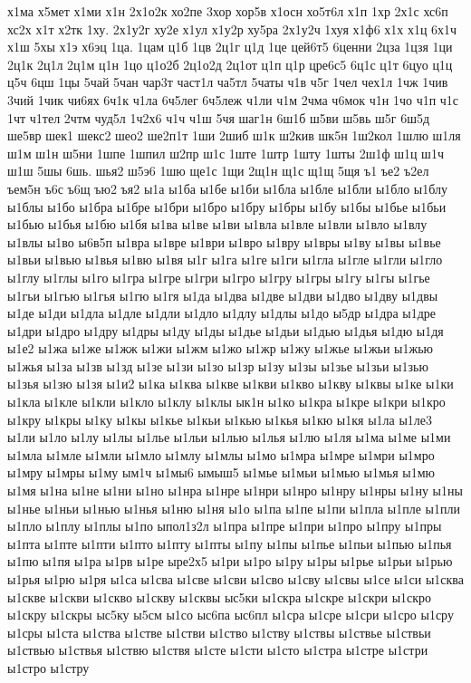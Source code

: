 {х1ма
х5мет
х1ми
х1н
2х1о2к
хо2пе
3хор
хор5в
х1осн
хо5т6л
х1п
1хр
2х1с
хс6п
хс2х
х1т
х2тк
1ху.
2х1у2г
ху2е
х1ул
х1у2р
ху5ра
2х1у2ч
1хуя
х1ф6
х1х
х1ц
6х1ч
х1ш
5хы
х1э
х6эц
1ца.
1цам
ц1б
1цв
2ц1г
ц1д
1це
цей6т5
6ценни
2цза
1цзя
1ци
2ц1к
2ц1л
2ц1м
ц1н
1цо
ц1о2б
2ц1о2д
2ц1от
ц1п
ц1р
цре6с5
6ц1с
ц1т
6цуо
ц1ц
ц5ч
6цш
1цы
5чай
5чан
чар3т
част1л
ча5тл
5чаты
ч1в
ч5г
1чел
чех1л
1чж
1чив
3чий
1чик
чи6ях
6ч1к
ч1ла
6ч5лег
6ч5леж
ч1ли
ч1м
2чма
ч6мок
ч1н
1чо
ч1п
ч1с
1чт
ч1тел
2чтм
чуд5л
1ч2х6
ч1ч
ч1ш
5чя
шаг1н
6ш1б
ш5ви
ш5вь
ш5г
6ш5д
ше5вр
шек1
шекс2
шео2
ше2п1т
1ши
2шиб
ш1к
ш2кив
шк5н
1ш2кол
1шлю
ш1ля
ш1м
ш1н
ш5ни
1шпе
1шпил
ш2пр
ш1с
1ште
1штр
1шту
1шты
2ш1ф
ш1ц
ш1ч
ш1ш
5шы
6шь.
шья2
ш5э6
1шю
ще1с
1щи
2щ1н
щ1с
щ1щ
5щя
ъ1
ъе2
ъ2ел
ъем5н
ъ6с
ъ6щ
ъю2
ъя2
ы1а
ы1ба
ы1бе
ы1би
ы1бла
ы1бле
ы1бли
ы1бло
ы1блу
ы1блы
ы1бо
ы1бра
ы1бре
ы1бри
ы1бро
ы1бру
ы1бры
ы1бу
ы1бы
ы1бье
ы1бьи
ы1бью
ы1бья
ы1бю
ы1бя
ы1ва
ы1ве
ы1ви
ы1вла
ы1вле
ы1вли
ы1вло
ы1влу
ы1влы
ы1во
ы6в5п
ы1вра
ы1вре
ы1ври
ы1вро
ы1вру
ы1вры
ы1ву
ы1вы
ы1вье
ы1вьи
ы1вью
ы1вья
ы1вю
ы1вя
ы1г
ы1га
ы1ге
ы1ги
ы1гла
ы1гле
ы1гли
ы1гло
ы1глу
ы1глы
ы1го
ы1гра
ы1гре
ы1гри
ы1гро
ы1гру
ы1гры
ы1гу
ы1гы
ы1гье
ы1гьи
ы1гью
ы1гья
ы1гю
ы1гя
ы1да
ы1два
ы1две
ы1дви
ы1дво
ы1дву
ы1двы
ы1де
ы1ди
ы1дла
ы1дле
ы1дли
ы1дло
ы1длу
ы1длы
ы1до
ы5др
ы1дра
ы1дре
ы1дри
ы1дро
ы1дру
ы1дры
ы1ду
ы1ды
ы1дье
ы1дьи
ы1дью
ы1дья
ы1дю
ы1дя
ы1е2
ы1жа
ы1же
ы1жж
ы1жи
ы1жм
ы1жо
ы1жр
ы1жу
ы1жье
ы1жьи
ы1жью
ы1жья
ы1за
ы1зв
ы1зд
ы1зе
ы1зи
ы1зо
ы1зр
ы1зу
ы1зы
ы1зье
ы1зьи
ы1зью
ы1зья
ы1зю
ы1зя
ы1и2
ы1ка
ы1ква
ы1кве
ы1кви
ы1кво
ы1кву
ы1квы
ы1ке
ы1ки
ы1кла
ы1кле
ы1кли
ы1кло
ы1клу
ы1клы
ык1н
ы1ко
ы1кра
ы1кре
ы1кри
ы1кро
ы1кру
ы1кры
ы1ку
ы1кы
ы1кье
ы1кьи
ы1кью
ы1кья
ы1кю
ы1кя
ы1ла
ы1ле3
ы1ли
ы1ло
ы1лу
ы1лы
ы1лье
ы1льи
ы1лью
ы1лья
ы1лю
ы1ля
ы1ма
ы1ме
ы1ми
ы1мла
ы1мле
ы1мли
ы1мло
ы1млу
ы1млы
ы1мо
ы1мра
ы1мре
ы1мри
ы1мро
ы1мру
ы1мры
ы1му
ым1ч
ы1мы6
ымыш5
ы1мье
ы1мьи
ы1мью
ы1мья
ы1мю
ы1мя
ы1на
ы1не
ы1ни
ы1но
ы1нра
ы1нре
ы1нри
ы1нро
ы1нру
ы1нры
ы1ну
ы1ны
ы1нье
ы1ньи
ы1нью
ы1нья
ы1ню
ы1ня
ы1о
ы1па
ы1пе
ы1пи
ы1пла
ы1пле
ы1пли
ы1пло
ы1плу
ы1плы
ы1по
ыпол1з2л
ы1пра
ы1пре
ы1при
ы1про
ы1пру
ы1пры
ы1пта
ы1пте
ы1пти
ы1пто
ы1пту
ы1пты
ы1пу
ы1пы
ы1пье
ы1пьи
ы1пью
ы1пья
ы1пю
ы1пя
ы1ра
ы1рв
ы1ре
ыре2х5
ы1ри
ы1ро
ы1ру
ы1ры
ы1рье
ы1рьи
ы1рью
ы1рья
ы1рю
ы1ря
ы1са
ы1сва
ы1све
ы1сви
ы1сво
ы1сву
ы1свы
ы1се
ы1си
ы1сква
ы1скве
ы1скви
ы1скво
ы1скву
ы1сквы
ыс5ки
ы1скра
ы1скре
ы1скри
ы1скро
ы1скру
ы1скры
ыс5ку
ы5см
ы1со
ыс6па
ыс6пл
ы1сра
ы1сре
ы1сри
ы1сро
ы1сру
ы1сры
ы1ста
ы1ства
ы1стве
ы1стви
ы1ство
ы1ству
ы1ствы
ы1ствье
ы1ствьи
ы1ствью
ы1ствья
ы1ствю
ы1ствя
ы1сте
ы1сти
ы1сто
ы1стра
ы1стре
ы1стри
ы1стро
ы1стру
}
